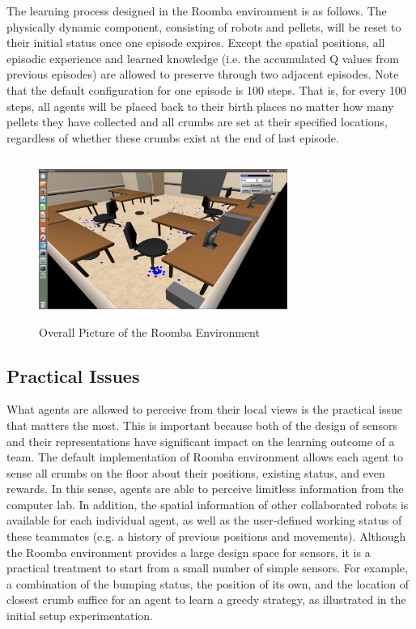\documentclass[conference]{IEEEtran}
\begin{document}
The learning process designed in the Roomba environment is as follows. 
The physically dynamic component, consisting of robots and pellets, will be
reset to their initial status once one episode expires. 
Except the spatial positions, all episodic experience and learned knowledge
(i.e. the accumulated Q values from previous episodes) are allowed to preserve
through two adjacent episodes.  
Note that the default configuration for one episode is 100 steps. That is,
for every 100 steps, all agents will be placed back to their birth places no
matter how many pellets they have collected and all crumbs are set at
their specified locations, regardless of whether these crumbs exist at the end
of last episode. 

\begin{figure}[!t]
\centering
\includegraphics[width=3.2in,height=2.1in]{./figures/roombas/roomba2.png}
\caption{Overall Picture of the Roomba Environment}
\label{roomba:world}
\end{figure}

\subsection{Practical Issues}
What agents are allowed to perceive from their local views is the practical
issue that matters the most. 
This is important because both of the design of sensors and their
representations have significant impact on the learning outcome of a team. 
The default implementation of Roomba environment allows each agent to sense
all crumbs on the floor about their positions, existing status, and even rewards. 
In this sense, agents are able to perceive limitless information from the
computer lab. 
In addition, the spatial information of other collaborated robots
is available for each individual agent, as well as the user-defined working
status of these teammates (e.g. a history of previous positions and
movements).  Although the Roomba environment provides a large design space for
sensors, it is a practical treatment to start from a small number of simple
sensors. For example, a combination of the bumping status, the position of its
own, and the location of closest crumb suffice for an agent to learn a greedy
strategy, as illustrated in the initial setup experimentation.  
\end{document}
